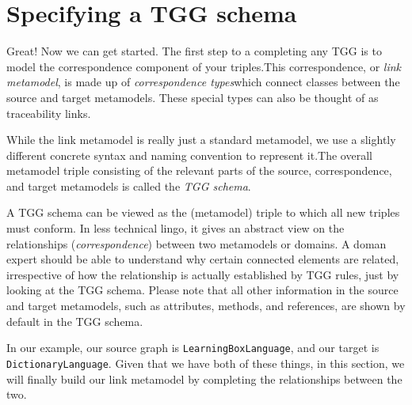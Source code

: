 \newpage
\section{Specifying a TGG schema}
\genHeader

Great! Now we can get started. The first step to a completing any TGG is to model the correspondence component of your triples.This
correspondence, or \emph{link metamodel}, is made up of \emph{correspondence types}which connect classes between the source and
target metamodels. These special types can also be thought of as traceability links.

While the link metamodel is really just a standard metamodel, we use a slightly different concrete syntax and naming convention to represent it.The overall metamodel triple consisting of the relevant parts of the source, correspondence, and target metamodels is called the \emph{TGG schema}.

A TGG schema can be viewed as the (metamodel) triple to which all new triples must conform. In less technical lingo, it gives an abstract view on the
relationships (\emph{correspondence}) between two metamodels or domains. A doman expert should be able to understand why certain connected elements are related,
irrespective of how the relationship is actually established by TGG rules, just by looking at the TGG schema. Please note that all other information in the
source and target metamodels, such as attributes, methods, and references, are shown by default in the TGG schema.

In our example, our source graph is \texttt{LearningBoxLanguage}, and our target is \texttt{DictionaryLanguage}. Given that we have both of these things, in
this section, we will finally build our link metamodel by completing the relationships between the two.





